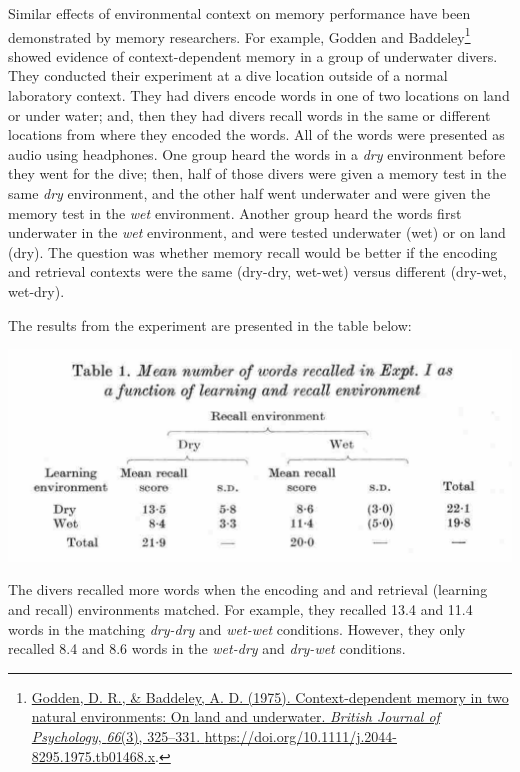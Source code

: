 \documentclass[
  oneside,
  12pt]{crumpbook}
\begin{document}
Similar effects of environmental context on memory performance have been demonstrated by memory researchers. For example, Godden and Baddeley\footnote{\protect\hyperlink{ref-goddenContextdependentMemoryTwo1975}{Godden, D. R., \& Baddeley, A. D. (1975). Context-dependent memory in two natural environments: {On} land and underwater. \emph{British Journal of Psychology}, \emph{66}(3), 325--331. \url{https://doi.org/10.1111/j.2044-8295.1975.tb01468.x}}.} showed evidence of context-dependent memory in a group of underwater divers. They conducted their experiment at a dive location outside of a normal laboratory context. They had divers encode words in one of two locations on land or under water; and, then they had divers recall words in the same or different locations from where they encoded the words. All of the words were presented as audio using headphones. One group heard the words in a \emph{dry} environment before they went for the dive; then, half of those divers were given a memory test in the same \emph{dry} environment, and the other half went underwater and were given the memory test in the \emph{wet} environment. Another group heard the words first underwater in the \emph{wet} environment, and were tested underwater (wet) or on land (dry). The question was whether memory recall would be better if the encoding and retrieval contexts were the same (dry-dry, wet-wet) versus different (dry-wet, wet-dry).

The results from the experiment are presented in the table below:

\begin{center}\includegraphics[width=1\linewidth]{imgs/Godden_Baddeley_data} \end{center}

The divers recalled more words when the encoding and and retrieval (learning and recall) environments matched. For example, they recalled 13.4 and 11.4 words in the matching \emph{dry-dry} and \emph{wet-wet} conditions. However, they only recalled 8.4 and 8.6 words in the \emph{wet-dry} and \emph{dry-wet} conditions.
\end{document}
